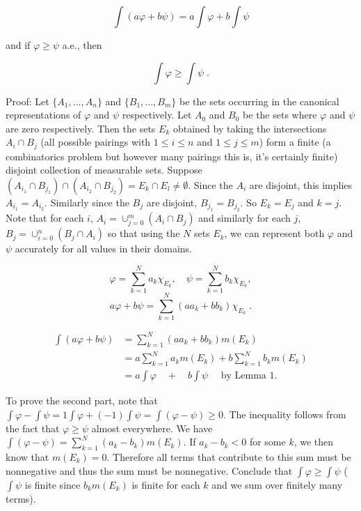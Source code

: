 \documentclass[a4paper]{article}
\begin{document}
$$\int \left(a\varphi + b \psi \right) = a\int \varphi + b \int \psi $$ 

and if $\varphi \geq \psi$ a.e., then 

$$\int \varphi \geq \int \psi \;. $$

Proof: Let $\{A_1, ..., A_n\}$ and $\{B_1, ..., B_m\}$ be the sets occurring in the canonical representations of $\varphi$ and $\psi$ respectively. Let $A_0$ and $B_0$ be the sets where $\varphi$ and $\psi$ are zero respectively. Then the sets $E_k$ obtained by taking the intersections $A_i \cap B_j$ (all possible pairings with $1\leq i \leq n$ and $1 \leq j \leq m$) form a finite (a combinatorics problem but however many pairings this is, it's certainly finite) disjoint collection of measurable sets. Suppose $(A_{i_1}\cap B_{j_1})\cap (A_{i_2}\cap B_{j_2}) = E_k \cap E_l  \neq \emptyset$. Since the $A_i$ are disjoint, this implies $A_{i_1} = A_{i_2}$. Similarly since the $B_j$ are disjoint, $B_{j_1} = B_{j_2}$. So $E_k = E_j$ and $k = j$. Note that for each $i$, $A_i = \cup_{j=0}^m (A_i\cap B_j)$ and similarly for each $j$, $B_j = \cup_{i=0}^n (B_j \cap A_i)$ so that using the $N$ sets $E_k$, we can represent both $\varphi$ and $\psi$ accurately for all values in their domains. 

$$\varphi = \sum_{k=1}^N a_k \chi_{E_k}, \quad \psi = \sum_{k=1}^N b_k \chi_{E_k}, $$
$$a\varphi + b \psi = \sum_{k=1}^N (aa_k + bb_k)\chi_{E_k} \;.$$

\begin{align*}
\int \left(a\varphi + b \psi\right) &= \sum_{k=1}^N (aa_k + bb_k)m(E_k)\\
&= a\sum_{k=1}^N a_km(E_k) + b\sum_{k=1}^N b_km(E_k) \\
&= a \int \varphi \quad + \quad b \int \psi \quad \text{ by Lemma 1}.
\end{align*}

To prove the second part, note that $\int \varphi - \int \psi = 1\int \varphi + (-1)\int \psi = \int (\varphi - \psi) \geq 0$. The inequality follows from the fact that $\varphi \geq \psi$ almost everywhere. We have $\int (\varphi - \psi) = \sum_{k=1}^N (a_k - b_k)m(E_k)$. If $a_k - b_k < 0$ for some $k$, we then know that $m(E_k) = 0$. Therefore all terms that contribute to this sum must be nonnegative and thus the sum must be nonnegative. Conclude that $\int \varphi \geq \int \psi$ ($\int \psi$ is finite since $b_km(E_k)$ is finite for each $k$ and we sum over finitely many terms). \\
\end{document}
